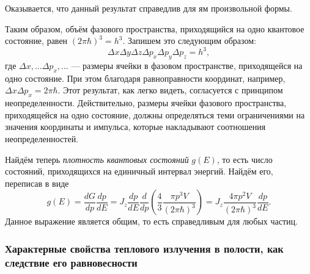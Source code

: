 Оказывается, что данный результат справедлив для ям произвольной формы.

Таким образом, объём фазового пространства, приходящийся на одно квантовое
состояние, равен $ (2\pi\hbar)^3 = h^3 $. Запишем это следующим образом: 
\[
    \Delta x \Delta y \Delta z \Delta p_x \Delta p_y \Delta p_z = h^3,
\]
где $ \Delta x, \ldots \Delta p_x, \ldots $ --- размеры ячейки в фазовом пространстве, приходящейся
на одно состояние. При этом благодаря равноправности координат, например, $
\Delta x \Delta
p_x = 2\pi \hbar$. Этот результат, как легко видеть, согласуется с принципом 
неопределенности. Действительно, размеры ячейки фазового 
пространства, приходящейся на одно состояние, должны определяться
теми ограничениями на значения координаты и импульса, которые
накладывают соотношения неопределенностей.

Найдём теперь \emph{плотность квантовых состояний} $ g(E) $, то есть число
состояний, приходящихся на единичный интервал энергий. Найдём его, переписав в
виде 
\[
    g(E)  = \frac{dG}{dp} \frac{dp}{dE} = J_z \frac{dp}{dE} \frac{d}{dp} \left(
    \frac{4}{3} \frac{\pi p^3 V}{(2\pi \hbar)^3}\right) = J_z \frac{4\pi p^2
  V}{(2\pi\hbar)^3} \frac{dp}{dE}.
\]
Данное выражение является общим, то есть справедливым для любых частиц.

\subsubsection{Характерные свойства теплового излучения в полости, как следствие его равновесности}

